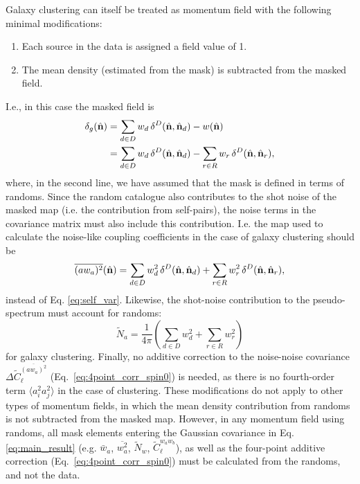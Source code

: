 \documentclass[aps,twocolumn, superscriptaddress, english, nofootinbib, 10pt]{revtex4-2}
\newcommand{\nv}{\hat{\bf n}}
\begin{document}
    Galaxy clustering can itself be treated as momentum field with the following minimal modifications:
    \begin{enumerate}
      \item Each source in the data is assigned a field value of 1.
      \item The mean density (estimated from the mask) is subtracted from the masked field.
    \end{enumerate}
    I.e., in this case the masked field is
    \begin{align}\nonumber
      \delta_g(\nv)
      &=\sum_{d\in D}w_d\,\delta^D(\nv,\nv_d)-w(\nv)\\\nonumber
      &=\sum_{d\in D}w_d\,\delta^D(\nv,\nv_d)-\sum_{r\in R}w_r\,\delta^D(\nv,\nv_r),
    \end{align}
    where, in the second line, we have assumed that the mask is defined in terms of randoms. Since the random catalogue also contributes to the shot noise of the masked map (i.e. the contribution from self-pairs), the noise terms in the covariance matrix must also include this contribution. I.e. the map used to calculate the noise-like coupling coefficients in the case of galaxy clustering should be
    \begin{equation}
      \overline{(aw_a)^2}(\nv)=\sum_{d\in D}w_d^2\,\delta^D(\nv,\nv_d)+\sum_{r\in R}w_r^2\,\delta^D(\nv,\nv_r),
    \end{equation}
    instead of Eq. \ref{eq:self_var}. Likewise, the shot-noise contribution to the pseudo-spectrum must account for randoms:
    \begin{equation}
      \tilde{N}_a=\frac{1}{4\pi}\left(\sum_{d\in D}w_d^2+\sum_{r\in R}w_r^2\right)
    \end{equation}
    for galaxy clustering. Finally, no additive correction to the noise-noise covariance $\Delta\tilde{C}^{\overline{(aw_a)^2}}_\ell$ (Eq.~\ref{eq:4point_corr_spin0}) is needed, as there is no fourth-order term $\langle a_i^2 a_j^2 \rangle$ in the case of clustering. These modifications do not apply to other types of momentum fields, in which the mean density contribution from randoms is not subtracted from the masked map. However, in any momentum field using randoms, all mask elements entering the Gaussian covariance in Eq. \ref{eq:main_result} (e.g. $\bar{w}_a$, $\overline{w_a^2}$, $\tilde{N}_w$, $\tilde{C}^{w_aw_b}_\ell$), as well as the four-point additive correction (Eq.~\ref{eq:4point_corr_spin0}) must be calculated from the randoms, and not the data.
\end{document}
